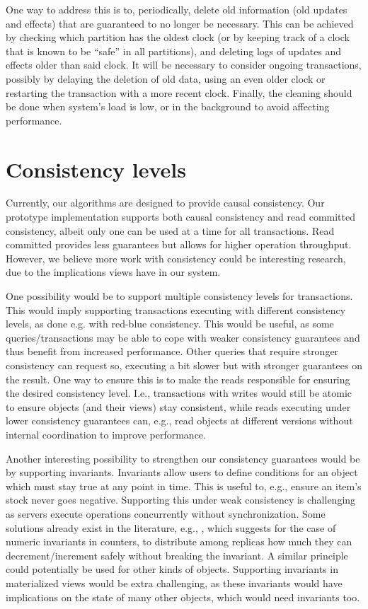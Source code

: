 One way to address this is to, periodically, delete old information (old updates and effects) that are guaranteed to no longer be necessary.
This can be achieved by checking which partition has the oldest clock (or by keeping track of a clock that is known to be ``safe'' in all partitions), and deleting logs of updates and effects older than said clock.
It will be necessary to consider ongoing transactions, possibly by delaying the deletion of old data, using an even older clock or restarting the transaction with a more recent clock.
Finally, the cleaning should be done when system's load is low, or in the background to avoid affecting performance.

\section{Consistency levels}
\label{sec:consistency_levels}

Currently, our algorithms are designed to provide causal consistency.
Our prototype implementation supports both causal consistency and read committed consistency, albeit only one can be used at a time for all transactions.
Read committed provides less guarantees but allows for higher operation throughput.
However, we believe more work with consistency could be interesting research, due to the implications views have in our system.

One possibility would be to support multiple consistency levels for transactions.
This would imply supporting transactions executing with different consistency levels, as done e.g. with red-blue consistency.
This would be useful, as some queries/transactions may be able to cope with weaker consistency guarantees and thus benefit from increased performance.
Other queries that require stronger consistency can request so, executing a bit slower but with stronger guarantees on the result.
One way to ensure this is to make the reads responsible for ensuring the desired consistency level.
I.e., transactions with writes would still be atomic to ensure objects (and their views) stay consistent, while reads executing under lower consistency guarantees can, e.g., read objects at different versions without internal coordination to improve performance.

Another interesting possibility to strengthen our consistency guarantees would be by supporting invariants.
Invariants allow users to define conditions for an object which must stay true at any point in time.
This is useful to, e.g., ensure an item's stock never goes negative.
Supporting this under weak consistency is challenging as servers execute operations concurrently without synchronization.
Some solutions already exist in the literature, e.g., \cite{boundedCounter}, which suggests for the case of numeric invariants in counters, to distribute among replicas how much they can decrement/increment safely without breaking the invariant.
A similar principle could potentially be used for other kinds of objects.
Supporting invariants in materialized views would be extra challenging, as these invariants would have implications on the state of many other objects, which would need invariants too.

